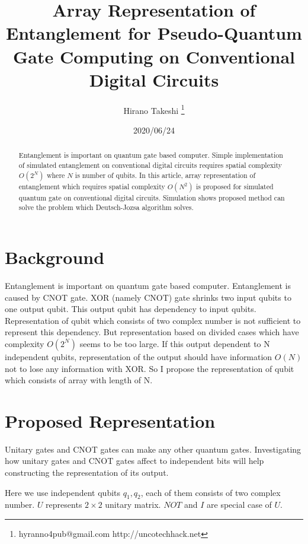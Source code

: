 \documentclass[dvipdfmx]{article}
\title{Array Representation of Entanglement for Pseudo-Quantum Gate Computing on Conventional Digital Circuits}
\author{Hirano Takeshi \thanks{hyranno4pub@gmail.com http://uncotechhack.net}}
\date{2020/06/24}
\begin{document}
\maketitle

\begin{abstract}
Entanglement is important on quantum gate based computer.
Simple implementation of simulated entanglement on conventional digital circuits requires
 spatial complexity $O(2^{N})$ where $N$ is number of qubits.
In this article, array representation of entanglement which requires
 spatial complexity $O(N^{2})$ is proposed for simulated quantum gate on conventional digital circuits.
Simulation shows proposed method can solve the problem which Deutsch-Jozsa algorithm solves.
\end{abstract}


\section{Background}
Entanglement is important on quantum gate based computer.
Entanglement is caused by CNOT gate.
XOR (namely CNOT) gate shrinks two input qubits to one output qubit.
This output qubit has dependency to input qubits.
Representation of qubit which consists of two complex number is not sufficient to represent this dependency.
But representation based on divided cases which have complexity $O(2^{N})$ seems to be too large.
If this output dependent to N independent qubits, representation of the output
 should have information $O(N)$ not to lose any information with XOR.
So I propose the representation of qubit which consists of array with length of N.


\section{Proposed Representation}
Unitary gates and CNOT gates can make any other quantum gates.
Investigating how unitary gates and CNOT gates affect to independent bits will help constructing the representation of its output.

Here we use independent qubits $q_{1}, q_{2}$, each of them consists of two complex number.
$U$ represents $2 \times 2$ unitary matrix.
$NOT$ and $I$ are special case of $U$.
\end{document}
